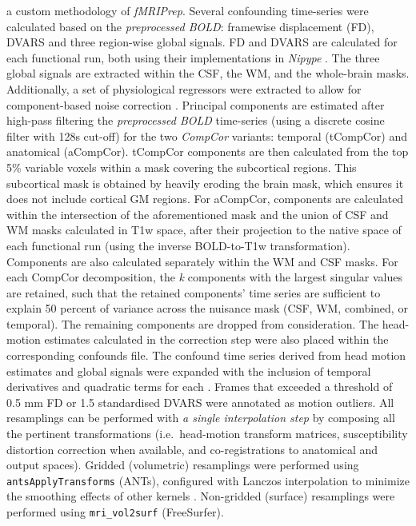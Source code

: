 \documentclass[10pt,letterpaper]{article}
\begin{document}
\begin{description}
 a custom methodology of \emph{fMRIPrep}.
Several confounding time-series were calculated based on the \emph{preprocessed BOLD}:
framewise displacement (FD), DVARS and three region-wise global signals.
FD and DVARS are calculated for each functional run, both using their
implementations in \emph{Nipype} \cite[following the definitions
by]{power_fd_dvars}. The three global signals are extracted within the
CSF, the WM, and the whole-brain masks. Additionally, a set of
physiological regressors were extracted to allow for component-based
noise correction \cite[\emph{CompCor},]{compcor}. Principal
components are estimated after high-pass filtering the
\emph{preprocessed BOLD} time-series (using a discrete cosine filter
with 128s cut-off) for the two \emph{CompCor} variants: temporal
(tCompCor) and anatomical (aCompCor). tCompCor components are then
calculated from the top 5\% variable voxels within a mask covering the
subcortical regions. This subcortical mask is obtained by heavily
eroding the brain mask, which ensures it does not include cortical GM
regions. For aCompCor, components are calculated within the intersection
of the aforementioned mask and the union of CSF and WM masks calculated
in T1w space, after their projection to the native space of each
functional run (using the inverse BOLD-to-T1w transformation).
Components are also calculated separately within the WM and CSF masks.
For each CompCor decomposition, the \emph{k} components with the largest
singular values are retained, such that the retained components' time
series are sufficient to explain 50 percent of variance across the
nuisance mask (CSF, WM, combined, or temporal). The remaining components
are dropped from consideration. The head-motion estimates calculated in
the correction step were also placed within the corresponding confounds
file. The confound time series derived from head motion estimates and
global signals were expanded with the inclusion of temporal derivatives
and quadratic terms for each \cite{confounds_satterthwaite_2013}.
Frames that exceeded a threshold of 0.5 mm FD or 1.5 standardised DVARS
were annotated as motion outliers. All resamplings can be performed with
\emph{a single interpolation step} by composing all the pertinent
transformations (i.e.~head-motion transform matrices, susceptibility
distortion correction when available, and co-registrations to anatomical
and output spaces). Gridded (volumetric) resamplings were performed
using \texttt{antsApplyTransforms} (ANTs), configured with Lanczos
interpolation to minimize the smoothing effects of other kernels
\cite{lanczos}. Non-gridded (surface) resamplings were performed using
\texttt{mri\_vol2surf} (FreeSurfer).
\end{description}
\end{document}
